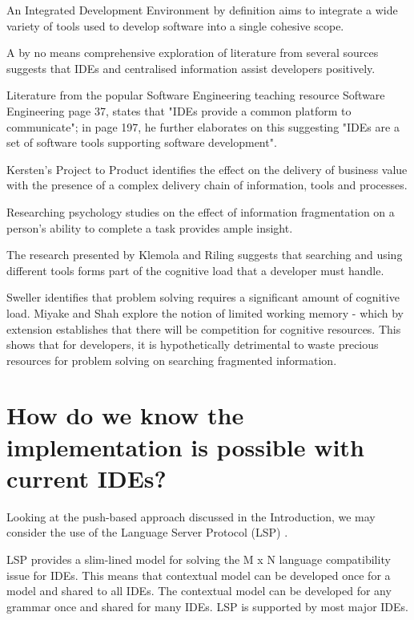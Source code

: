 An Integrated Development Environment by definition aims to integrate a wide variety of tools used to develop software into a single cohesive scope. 

A by no means comprehensive exploration of literature from several sources suggests that IDEs and centralised information assist developers positively. 

Literature from the popular Software Engineering teaching resource Software Engineering \parencite{Sommerville:2010:SE:1841764} page 37, states that "IDEs provide a common platform to communicate"; in page 197, he further elaborates on this suggesting "IDEs are a set of software tools supporting software development".

Kersten's Project to Product \parencite*{kersten2018projecproduct} identifies the effect on the delivery of business value with the presence of a complex delivery chain of information, tools and processes.

Researching psychology studies on the effect of information fragmentation on a person's ability to complete a task provides ample insight. 

The research presented by Klemola and Riling \parencite*{klemola2002modeling} suggests that searching and using different tools forms part of the cognitive load that a developer must handle.

Sweller \parencite*{sweller1998cognitive} identifies that problem solving requires a significant amount of cognitive load. Miyake and Shah \parencite*{miyake1999models} explore the notion of limited working memory - which by extension establishes that there will be competition for cognitive resources. This shows that for developers, it is hypothetically detrimental to waste precious resources for problem solving on searching fragmented information.


\section{How do we know the implementation is possible with current IDEs?}

Looking at the push-based approach discussed in the Introduction, we may consider the use of the Language Server Protocol (LSP) \parencite{lspGitHubSiteMSFT}.

LSP provides a slim-lined model for solving the M x N language compatibility issue for IDEs. This means that contextual model can be developed once for a model and shared to all IDEs. The contextual model can be developed for any grammar once and shared for many IDEs. LSP is supported by most major IDEs.

